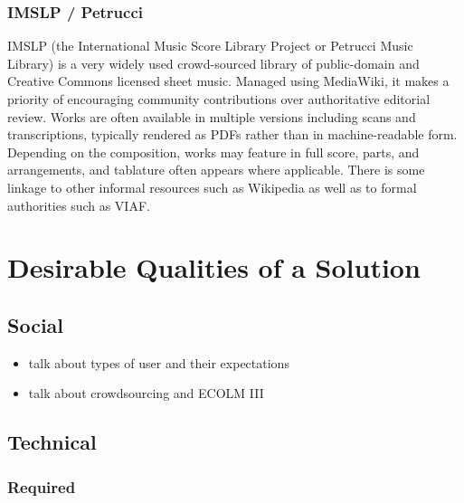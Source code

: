 \documentclass[sigconf, nonacm=true]{acmart}
\begin{document}
\begin{sloppypar}
  \subsubsection{IMSLP / Petrucci}

  IMSLP (the International Music Score Library Project or Petrucci
  Music Library) is a very widely used crowd-sourced library of
  public-domain and Creative Commons licensed sheet music. Managed
  using MediaWiki, it makes a priority of encouraging community
  contributions over authoritative editorial review. Works are often
  available in multiple versions including scans and transcriptions,
  typically rendered as PDFs rather than in machine-readable
  form. Depending on the composition, works may feature in full score,
  parts, and arrangements, and tablature often appears where
  applicable. There is some linkage to other informal resources such
  as Wikipedia as well as to formal authorities such as VIAF.
  
  \section{Desirable Qualities of a Solution}\label{desirable-qualities}
  \subsection{Social}

  \begin{itemize}
  \item talk about types of user and their expectations
  \item talk about crowdsourcing and ECOLM III
  \end{itemize}

  
  \subsection{Technical}

  \subsubsection{Required}
  

\end{sloppypar}
\end{document}
